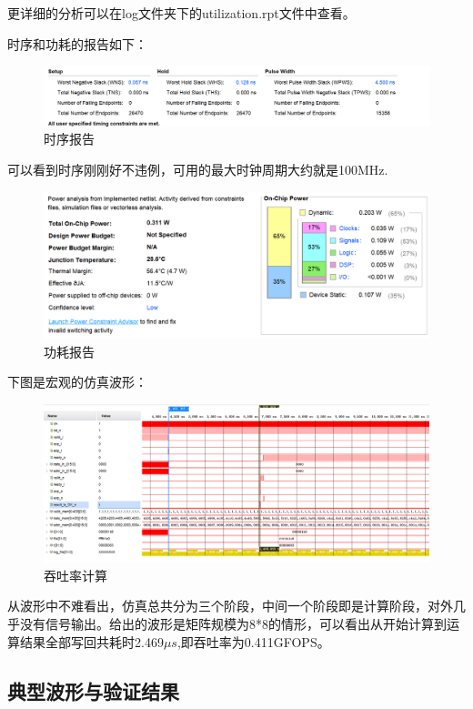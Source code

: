 \documentclass{article}
\begin{document}
更详细的分析可以在log文件夹下的utilization.rpt文件中查看。

时序和功耗的报告如下：
\begin{figure}[!ht]
    \centering
    \includegraphics[width = \textwidth]{Timing Report.png}
    \caption{时序报告}
\end{figure}

可以看到时序刚刚好不违例，可用的最大时钟周期大约就是100MHz.

\begin{figure}[!ht]
    \centering
    \includegraphics[width = \textwidth]{Power.png}
    \caption{功耗报告}
\end{figure}

下图是宏观的仿真波形：

\begin{figure}[!ht]
    \centering
    \includegraphics[width = \textwidth]{Sim_1.png}
    \caption{吞吐率计算}
\end{figure}

从波形中不难看出，仿真总共分为三个阶段，中间一个阶段即是计算阶段，对外几乎没有信号输出。给出的波形是矩阵规模为8*8的情形，可以看出从开始计算到运算结果全部写回共耗时2.469$\mu s$,即吞吐率为0.411GFOPS。

\subsection{典型波形与验证结果}
\end{document}
